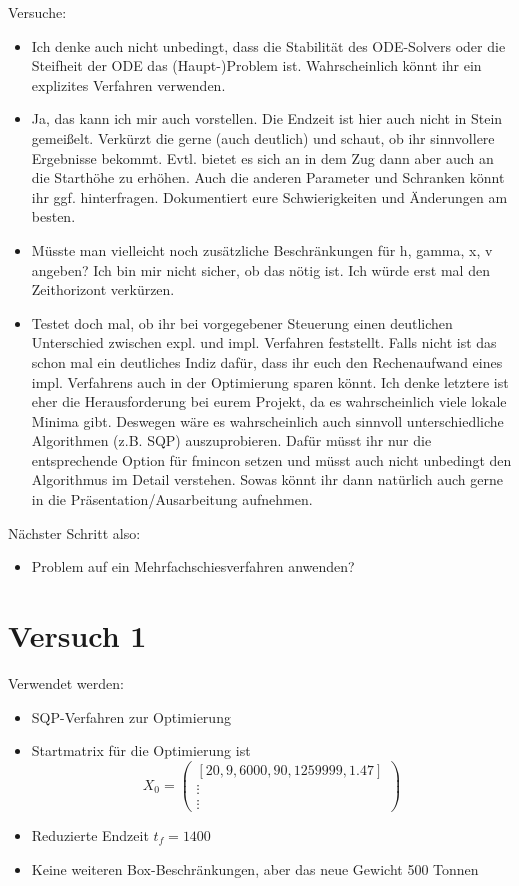 Versuche:
\begin{itemize}
\item Ich denke auch nicht unbedingt, dass die Stabilität des ODE-Solvers oder
die Steifheit der ODE das (Haupt-)Problem ist.
Wahrscheinlich könnt ihr ein explizites Verfahren verwenden.
%
\item Ja, das kann ich mir auch vorstellen. Die Endzeit ist hier auch nicht in
Stein gemeißelt. Verkürzt die gerne (auch deutlich) und schaut, ob ihr
sinnvollere Ergebnisse bekommt. Evtl. bietet es sich an in dem Zug dann
aber auch an die Starthöhe zu erhöhen. 
Auch die anderen Parameter und Schranken könnt ihr ggf. hinterfragen.
Dokumentiert eure Schwierigkeiten und Änderungen am besten.
%
\item Müsste man vielleicht noch zusätzliche Beschränkungen für h, gamma, x, v angeben? Ich bin mir nicht sicher, ob das nötig ist. Ich würde erst mal den
Zeithorizont verkürzen.
%
\item Testet doch mal, ob ihr bei vorgegebener Steuerung
einen deutlichen Unterschied zwischen expl. und impl. Verfahren
feststellt. Falls nicht ist das schon mal ein deutliches Indiz dafür,
dass ihr euch den Rechenaufwand eines impl. Verfahrens auch in der
Optimierung sparen könnt. Ich denke letztere ist eher die Herausforderung bei eurem Projekt, da es wahrscheinlich viele lokale Minima gibt. Deswegen wäre es wahrscheinlich auch sinnvoll unterschiedliche Algorithmen (z.B. SQP) auszuprobieren. Dafür müsst ihr nur die entsprechende Option für fmincon setzen und müsst auch nicht unbedingt den Algorithmus im Detail verstehen. Sowas könnt ihr dann natürlich auch gerne in die Präsentation/Ausarbeitung aufnehmen.
\end{itemize}



Nächster Schritt also:
\begin{itemize}
\item Problem auf ein Mehrfachschiesverfahren anwenden?
\end{itemize}


\section{Versuch 1}
Verwendet werden:
\begin{itemize}
\item SQP-Verfahren zur Optimierung 
\item Startmatrix für die Optimierung ist \[X_0 = \begin{pmatrix}
[20,9,6000,90,1259999,1.47] \\ 
\vdots \\ 
\vdots
\end{pmatrix}\]
\item Reduzierte Endzeit $t_f = 1400$
\item Keine weiteren Box-Beschränkungen, aber das neue Gewicht 500 Tonnen
\end{itemize}

